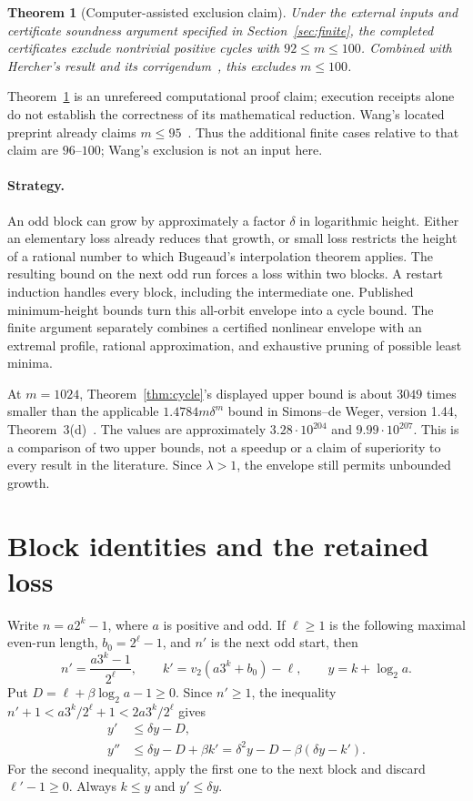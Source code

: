 \documentclass[11pt]{article}
\newtheorem{theorem}{Theorem}
\theoremstyle{definition}\newtheorem{definition}[theorem]{Definition}
\newcommand{\lb}{\log_2}
\newcommand{\val}{v_2}
\begin{document}
\begin{theorem}[Computer-assisted exclusion claim]\label{thm:finite}
Under the external inputs and certificate soundness argument specified in Section~\ref{sec:finite}, the completed certificates exclude nontrivial positive cycles with $92\le m\le100$. Combined with Hercher's result and its corrigendum~\cite{hercher}, this excludes $m\le100$.
\end{theorem}
Theorem~\ref{thm:finite} is an unrefereed computational proof claim; execution receipts alone do not establish the correctness of its mathematical reduction. Wang's located preprint already claims $m\le95$~\cite{wang}. Thus the additional finite cases relative to that claim are $96$--$100$; Wang's exclusion is not an input here.

\paragraph{Strategy.}
An odd block can grow by approximately a factor $\delta$ in logarithmic height. Either an elementary loss already reduces that growth, or small loss restricts the height of a rational number to which Bugeaud's interpolation theorem applies. The resulting bound on the next odd run forces a loss within two blocks. A restart induction handles every block, including the intermediate one. Published minimum-height bounds turn this all-orbit envelope into a cycle bound. The finite argument separately combines a certified nonlinear envelope with an extremal profile, rational approximation, and exhaustive pruning of possible least minima.

At $m=1024$, Theorem~\ref{thm:cycle}'s displayed upper bound is about $3049$ times smaller than the applicable $1.4784m\delta^m$ bound in Simons--de Weger, version 1.44, Theorem~3(d)~\cite{sdw}. The values are approximately $3.28\cdot10^{204}$ and $9.99\cdot10^{207}$. This is a comparison of two upper bounds, not a speedup or a claim of superiority to every result in the literature. Since $\lambda>1$, the envelope still permits unbounded growth.

\section{Block identities and the retained loss}\label{sec:blocks}
Write $n=a2^k-1$, where $a$ is positive and odd. If $\ell\ge1$ is the following maximal even-run length, $b_0=2^\ell-1$, and $n'$ is the next odd start, then
\begin{equation}\label{eq:block}
 n'=\frac{a3^k-1}{2^\ell},\qquad
 k'=\val(a3^k+b_0)-\ell,\qquad y=k+\lb a.
\end{equation}
Put $D=\ell+\beta\lb a-1\ge0$. Since $n'\ge1$, the inequality
$n'+1<a3^k/2^\ell+1<2a3^k/2^\ell$ gives
\begin{align}
 y'&\le\delta y-D,\label{eq:one}\\
 y''&\le\delta y-D+\beta k'
       =\delta^2y-D-\beta(\delta y-k').\label{eq:two}
\end{align}
For the second inequality, apply the first one to the next block and discard $\ell'-1\ge0$. Always $k\le y$ and $y'\le\delta y$.
\end{document}
